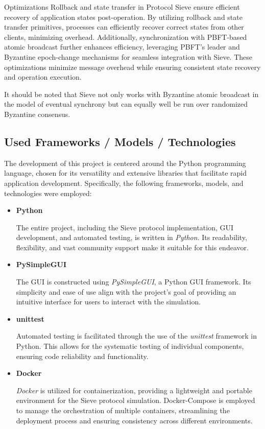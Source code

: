 \documentclass{scrartcl}
\begin{document}
Optimizations Rollback and state transfer in Protocol Sieve ensure efficient recovery of application states post-operation. By utilizing rollback and state transfer primitives, processes can efficiently recover correct states from other clients, minimizing overhead. Additionally, synchronization with PBFT-based atomic broadcast further enhances efficiency, leveraging PBFT's leader and Byzantine epoch-change mechanisms for seamless integration with Sieve. These optimizations minimize message overhead while ensuring consistent state recovery and operation execution.

It should be noted that Sieve not only works with Byzantine atomic broadcast in the model of eventual
synchrony but can equally well be run over randomized Byzantine consensus.\\


\subsection{Used Frameworks / Models / Technologies}
    
The development of this project is centered around the Python programming language, chosen for its versatility and extensive libraries that facilitate rapid application development. Specifically, the following frameworks, models, and technologies were employed:

\begin{itemize}
    \item \textbf{Python}
    
    The entire project, including the Sieve protocol implementation, GUI development, and automated testing, is written in \textit{Python}. Its readability, flexibility, and vast community support make it suitable for this endeavor.
    
    \item \textbf{PySimpleGUI}
    
    The GUI is constructed using \textit{PySimpleGUI}, a Python GUI framework. Its simplicity and ease of use align with the project's goal of providing an intuitive interface for users to interact with the simulation.
    
    \item \textbf{unittest}
    
    Automated testing is facilitated through the use of the \textit{unittest} framework in Python. This allows for the systematic testing of individual components, ensuring code reliability and functionality.
    
    \item \textbf{Docker}
    
    \textit{Docker} is utilized for containerization, providing a lightweight and portable environment for the Sieve protocol simulation. Docker-Compose is employed to manage the orchestration of multiple containers, streamlining the deployment process and ensuring consistency across different environments.
\end{itemize}
\end{document}
